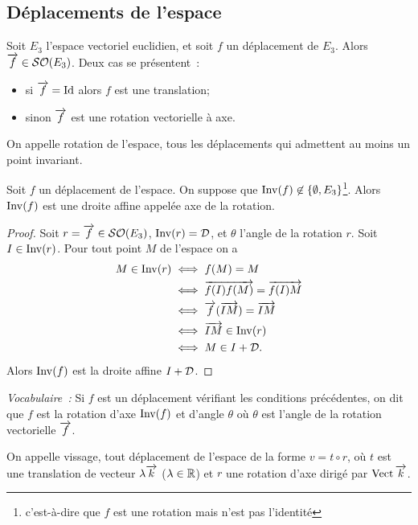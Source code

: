 \subsection{Déplacements de l'espace}

Soit \(E_3\) l'espace vectoriel euclidien, et soit \(f\) un déplacement de 
\(E_3\). Alors \(\overrightarrow{f} \in \mathcal{SO}\!\left(E_3\right)\). Deux cas se présentent~:
\begin{itemize}
  \item si \(\overrightarrow{f}=\operatorname{Id}\) alors \(f\) est une translation;
  \item sinon \(\overrightarrow{f}\) est une rotation vectorielle à axe.
\end{itemize}

\begin{defdef}
  On appelle rotation de l'espace, tous les déplacements qui admettent au moins 
  un point invariant.
\end{defdef}
\begin{prop}
  Soit \(f\) un déplacement de l'espace. On suppose que \(\operatorname{Inv}(f) \not\in 
  \{\emptyset, E_3\}\)\footnote{c'est-à-dire que \(f\) est une rotation mais 
  n'est pas l'identité}. Alors \(\operatorname{Inv}(f)\) est une droite affine appelée axe de 
  la rotation.
\end{prop}
\begin{proof}
  Soit \(r=\overrightarrow{f} \in\mathcal{SO}\!\left(E_3\right)\), \(\operatorname{Inv}(r)=\mathcal{D}\), et \(\theta\) l'angle de 
  la rotation \(r\). Soit \(I \in \operatorname{Inv}(r)\). Pour tout point \(M\) de l'espace 
  on a
  \begin{align*}
    M \in \operatorname{Inv}(r) &\iff f(M)=M \\
    &\iff \overrightarrow{f(I)f(M)} = \overrightarrow{f(I)M} \\
    &\iff \overrightarrow{f}(\overrightarrow{IM}) = \overrightarrow{IM} \\
    &\iff \overrightarrow{IM} \in \operatorname{Inv}(r)\\
    &\iff M \in I+\mathcal{D}.
  \end{align*}
  Alors \(\operatorname{Inv}(f)\) est la droite affine \(I+\mathcal{D}\).
\end{proof}

\emph{Vocabulaire~:} Si \(f\) est un déplacement vérifiant les conditions 
précédentes, on dit que \(f\) est la rotation d'axe \(\operatorname{Inv}(f)\) et d'angle 
\(\theta\) où \(\theta\) est l'angle de la rotation vectorielle \(\overrightarrow{f}\).

\begin{defdef}
  On appelle vissage, tout déplacement de l'espace de la forme \(v=t \circ r\), 
  où \(t\) est une translation de vecteur \(\lambda \overrightarrow{k}\) (\(\lambda \in \mathbb{R}\)) 
  et \(r\) une rotation d'axe dirigé par \(\operatorname{Vect}{\overrightarrow{k}}\).
\end{defdef}

